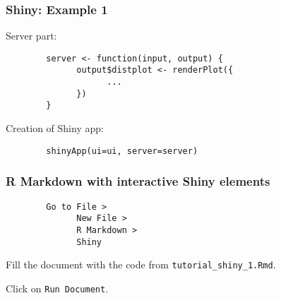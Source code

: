 \documentclass{beamer}
\begin{document}
	\begin{frame}[fragile]
		\frametitle{Shiny: Example 1}

		Server part:

		\begin{exampleblock}{}
		\begin{BVerbatim}
		server <- function(input, output) {
		      output$distplot <- renderPlot({
		            ...
		      })
		}
		\end{BVerbatim}
		\end{exampleblock}{}

		\vspace{2em}

		Creation of Shiny app:

		\begin{exampleblock}{}
		\begin{BVerbatim}
		shinyApp(ui=ui, server=server)
		\end{BVerbatim}
		\end{exampleblock}{}
	
	\end{frame}

	\begin{frame}[fragile]
		\frametitle{R Markdown with interactive Shiny elements}

		\begin{exampleblock}{}
		\begin{BVerbatim}
		Go to File >
		      New File >
		      R Markdown >
		      Shiny
		\end{BVerbatim}
		\end{exampleblock}{}

		\vspace{2em}

		Fill the document with the code from \verb|tutorial_shiny_1.Rmd|.

		\vspace{2em}

		Click on \verb|Run Document|.
	
	\end{frame}
\end{document}
